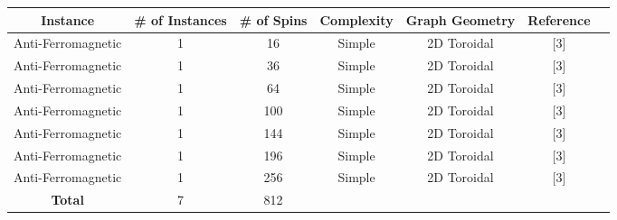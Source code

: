 \documentclass{standalone}
\begin{document}
\begin{tabular}{ |c|c|c|c|c|c|c| } 
    \hline
    \textbf{Instance} & \textbf{\# of Instances} & \textbf{\# of Spins} & \textbf{Complexity} & \textbf{Graph Geometry} & \textbf{Reference}\\ 
    \hline
    Anti-Ferromagnetic & 1 & 16 & Simple & 2D Toroidal & [3] \\
    Anti-Ferromagnetic & 1 & 36 & Simple & 2D Toroidal & [3] \\
    Anti-Ferromagnetic & 1 & 64 & Simple & 2D Toroidal & [3] \\
    Anti-Ferromagnetic & 1 & 100 & Simple & 2D Toroidal & [3] \\
    Anti-Ferromagnetic & 1 & 144 & Simple & 2D Toroidal & [3] \\
    Anti-Ferromagnetic & 1 & 196 & Simple & 2D Toroidal & [3] \\
    Anti-Ferromagnetic & 1 & 256 & Simple & 2D Toroidal & [3] \\
    \hline
    \textbf{Total} & 7 & 812 & & & \\
    \hline
\end{tabular}
\end{document}
